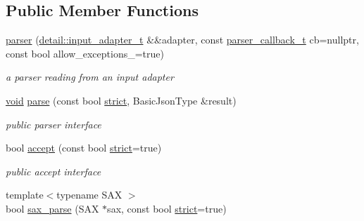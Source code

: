 \subsection*{Public Member Functions}
\begin{DoxyCompactItemize}
\item 
\mbox{\hyperlink{classnlohmann_1_1detail_1_1parser_a1a2bd258b7e99f86b7e6a3c41373ba55}{parser}} (\mbox{\hyperlink{namespacenlohmann_1_1detail_ae132f8cd5bb24c5e9b40ad0eafedf1c2}{detail\+::input\+\_\+adapter\+\_\+t}} \&\&adapter, const \mbox{\hyperlink{classnlohmann_1_1detail_1_1parser_ad250ad4f2b4af4a497e727c963162ff1}{parser\+\_\+callback\+\_\+t}} cb=nullptr, const bool allow\+\_\+exceptions\+\_\+=true)
\begin{DoxyCompactList}\small\item\em a parser reading from an input adapter \end{DoxyCompactList}\item 
\mbox{\hyperlink{namespacenlohmann_1_1detail_a59fca69799f6b9e366710cb9043aa77d}{void}} \mbox{\hyperlink{classnlohmann_1_1detail_1_1parser_a14338d8f3174601c0b2b7ef28752ab17}{parse}} (const bool \mbox{\hyperlink{namespacenlohmann_1_1detail_a5a76b60b26dc8c47256a996d18d967dfa2133fd717402a7966ee88d06f9e0b792}{strict}}, Basic\+Json\+Type \&result)
\begin{DoxyCompactList}\small\item\em public parser interface \end{DoxyCompactList}\item 
bool \mbox{\hyperlink{classnlohmann_1_1detail_1_1parser_a20997b42262856935b60fc91bf05bf3f}{accept}} (const bool \mbox{\hyperlink{namespacenlohmann_1_1detail_a5a76b60b26dc8c47256a996d18d967dfa2133fd717402a7966ee88d06f9e0b792}{strict}}=true)
\begin{DoxyCompactList}\small\item\em public accept interface \end{DoxyCompactList}\item 
{\footnotesize template$<$typename S\+AX $>$ }\\bool \mbox{\hyperlink{classnlohmann_1_1detail_1_1parser_a14e34931965064b26e118eb72cbd5e25}{sax\+\_\+parse}} (S\+AX $\ast$sax, const bool \mbox{\hyperlink{namespacenlohmann_1_1detail_a5a76b60b26dc8c47256a996d18d967dfa2133fd717402a7966ee88d06f9e0b792}{strict}}=true)
\end{DoxyCompactItemize}

